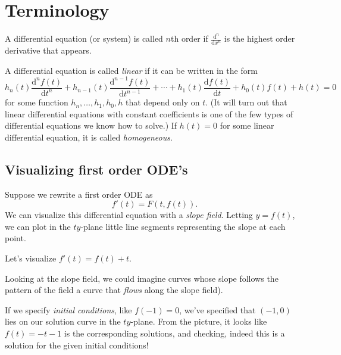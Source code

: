 \documentclass{problemset}
\renewcommand{\d}{\mathrm{d}}
\begin{document}
	\section*{Terminology}

	A differential equation (or system) is called $n$th order if $\frac{\d^n}{\d x^n}$ is the highest
	order derivative that appears.

	A differential equation is called \emph{linear} if it can be written in the form
	\[
		h_n(t)\frac{\d^n f(t)}{\d t^n} + h_{n-1}(t)\frac{\d^{n-1} f(t)}{\d t^{n-1}}
		+\cdots +h_1(t)\frac{\d f(t)}{\d t} + h_0(t) f(t) + h(t) = 0
	\]
	for some function $h_n,\ldots, h_1,h_0,h$ that depend only on $t$.  (It will turn out
	that linear differential equations with constant coefficients is one of the few types of
	differential equations we know how to solve.)  If $h(t)=0$ for some linear
	differential equation, it is called \emph{homogeneous}.

	\subsection*{Visualizing first order ODE's}

	Suppose we rewrite a first order ODE as
	\[
		f'(t) = F(t,f(t)).
	\]
	We can visualize this differential equation with a \emph{slope field}.  Letting $y=f(t)$,
	we can plot in the $ty$-plane little line segments representing the slope at each point.

	Let's visualize $f'(t) = f(t) + t$.

	\begin{center}
	{
	\def\length{sqrt(1+(x+y)^2)}
	}
	\end{center}

	Looking at the slope field, we could imagine curves whose slope follows the pattern of the field
	a curve that \emph{flows} along the slope field).

	If we specify \emph{initial conditions}, like $f(-1)=0$, we've specified
	that $(-1,0)$ lies on our solution curve in the $ty$-plane.  From the picture, it looks like
	$f(t) = -t-1$ is the corresponding solutions, and checking, indeed this is a solution for
	the given initial conditions!
\end{document}
